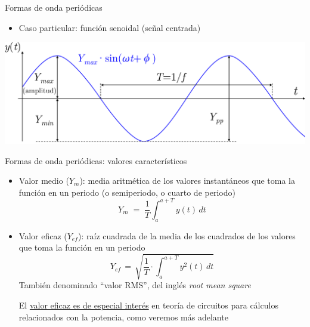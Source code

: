 \documentclass[aspectratio=169, usenames,svgnames,dvipsnames]{beamer}
\begin{document}

\begin{frame}{Formas de onda periódicas}
\vspace{1mm}
    \begin{itemize}
		\item Caso particular: \alert{función senoidal} (señal centrada)
    \end{itemize}

    \vspace{3mm}
    \begin{center}
        \includegraphics[width=.9\linewidth]{../figs/Senoidal_parametros.pdf}
    \end{center}   
\end{frame}


\begin{frame}{Formas de onda periódicas: \hspace{3mm}valores característicos} \label{diapo:valorEficaz_definicion}
    \vspace{1mm}
    \begin{itemize}
        \item \alert{Valor medio ($Y_m$)}: media aritmética de los valores instantáneos que toma la función en un periodo (o semiperiodo, o cuarto de periodo) 
        \begin{equation*}
            \boxed{\; Y_m \; = \; \frac{1}{T}\int_{a}^{a+T}y(t)\, dt \;}
        \end{equation*}
        \item \alert{Valor eficaz ($Y_{ef}$)}: raíz cuadrada de la media de los cuadrados de los valores que toma la función en un periodo
        \begin{equation*}
            \boxed{\; Y_{ef} \, = \, \sqrt{\frac{1}{T}\cdot\int_{a}^{a+T}y^{2}(t)\, dt} \;}
        \end{equation*}
        También denominado ``valor RMS'', del inglés \textit{root mean square}

        \vspace{3mm}
        El \underline{valor eficaz es de especial interés} en teoría de circuitos para \alert{cálculos relacionados con la potencia}, como veremos más adelante
	\end{itemize}
\end{frame}
\end{document}
